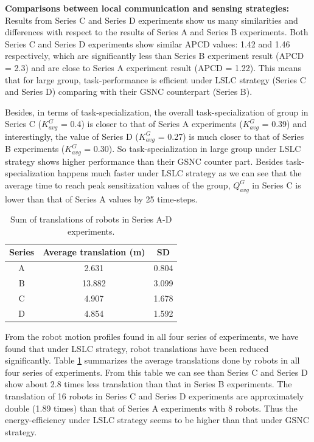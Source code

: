 \documentclass[final,5p,times,twocolumn]{elsarticle}
\begin{document}
\textbf{Comparisons between local communication and sensing strategies:} Results from Series C and Series D experiments show us many similarities and differences with respect to the results of Series A and Series B experiments. Both Series C and Series D experiments show similar APCD values: 1.42 and 1.46 respectively, which are significantly less than Series B experiment result (APCD = 2.3) and are close to Series A experiment result (APCD = 1.22). This means that for large group, task-performance  is efficient under LSLC strategy (Series C and Series D) comparing with their GSNC counterpart (Series B).

Besides, in terms of task-specialization, the overall task-specialization of group in Series C ($K^G_{avg}$ = 0.4) is  closer to that of Series A experiments ($K^G_{avg}$ = 0.39) and interestingly, the value of  Series D ($K^G_{avg}$ = 0.27) is  much closer to that of Series B experiments ($K^G_{avg}$ = 0.30). So task-specialization in large group under LSLC strategy shows higher performance than their GSNC counter part. Besides task-specialization happens much faster under LSLC strategy as we can see that the average time to reach peak sensitization values  of the group,  $Q^G_{avg}$ in Series C is lower than that of Series A values by 25 time-steps.

\begin{table}
\begin{center}
\caption{Sum of translations of robots in Series A-D experiments.}
\begin{tabular}{|c|c|c|}
\hline \textbf{Series} & \textbf{Average translation (m)} & \textbf{SD} \\ 
\hline A & 2.631 & 0.804\\ 
\hline B & 13.882 & 3.099\\
\hline C & 4.907 & 1.678\\
\hline D & 4.854 & 1.592\\
\hline
\end{tabular}
\label{table:motion-cmp} 
\end{center}
\end{table}
From the robot motion profiles found in all four series of experiments, we have found that under LSLC strategy, robot translations have been reduced significantly. Table \ref{table:motion-cmp} summarizes the average translations done by robots in all four series of experiments. From this table we can see than Series C and Series D show about 2.8 times less translation than that in Series B experiments. The translation of 16 robots in Series C and Series D experiments are approximately double (1.89 times) than that of Series A experiments with 8 robots.  Thus the energy-efficiency under LSLC strategy seems to be higher  than that under GSNC strategy.
\end{document}
